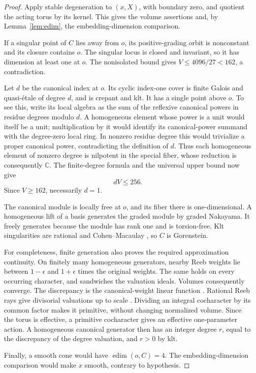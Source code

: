 \documentclass[11pt]{article}
\theoremstyle{definition}
\theoremstyle{remark}
\numberwithin{equation}{section}
\newcommand{\C}{\mathbb C}
\newcommand{\edim}{\operatorname{edim}}
\begin{document}
\begin{proof}
Apply stable degeneration to \((x,X)\), with boundary zero, and quotient the acting torus by its kernel. This gives the volume assertions and, by Lemma~\ref{lem:edim}, the embedding-dimension comparison.

If a singular point of \(C\) lies away from \(o\), its positive-grading orbit is nonconstant and its closure contains \(o\). The singular locus is closed and invariant, so it has dimension at least one at \(o\). The nonisolated bound gives \(V\le4096/27<162\), a contradiction.

Let \(d\) be the canonical index at \(o\). Its cyclic index-one cover is finite Galois and quasi-étale of degree \(d\), and is crepant and klt. It has a single point above \(o\). To see this, write its local algebra as the sum of the reflexive canonical powers in residue degrees modulo \(d\). A homogeneous element whose power is a unit would itself be a unit; multiplication by it would identify its canonical-power summand with the degree-zero local ring. In nonzero residue degree this would trivialize a proper canonical power, contradicting the definition of \(d\). Thus each homogeneous element of nonzero degree is nilpotent in the special fiber, whose reduction is consequently \(\C\). The finite-degree formula and the universal upper bound now give
\[
dV\le256.
\]
Since \(V\ge162\), necessarily \(d=1\).

The canonical module is locally free at \(o\), and its fiber there is one-dimensional. A homogeneous lift of a basis generates the graded module by graded Nakayama. It freely generates because the module has rank one and is torsion-free. Klt singularities are rational and Cohen--Macaulay \cite[Theorem~120]{KollarRational}, so \(C\) is Gorenstein.

For completeness, finite generation also proves the required approximation continuity. On finitely many homogeneous generators, nearby Reeb weights lie between \(1-\epsilon\) and \(1+\epsilon\) times the original weights. The same holds on every occurring character, and sandwiches the valuation ideals. Volumes consequently converge. The discrepancy is the canonical-weight linear function \cite[Lemma~2.18 and Remark~2.19]{LiXu}. Rational Reeb rays give divisorial valuations up to scale \cite[Lemma~2.16]{LiXu}. Dividing an integral cocharacter by its common factor makes it primitive, without changing normalized volume. Since the torus is effective, a primitive cocharacter gives an effective one-parameter action. A homogeneous canonical generator then has an integer degree \(r\), equal to the discrepancy of the degree valuation, and \(r>0\) by klt.

Finally, a smooth cone would have \(\edim(o,C)=4\). The embedding-dimension comparison would make \(x\) smooth, contrary to hypothesis.
\end{proof}
\end{document}
